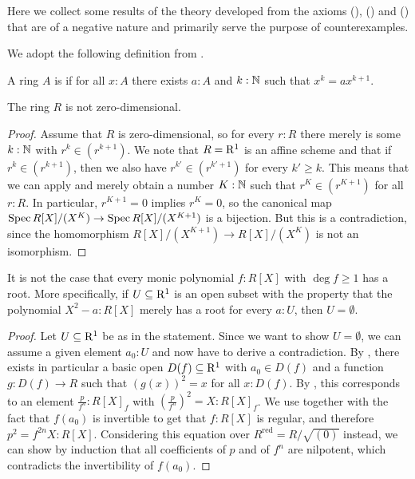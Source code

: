 Here we collect some results of
the theory developed from the axioms
(), () and ()
that are of a negative nature
and primarily serve the purpose of counterexamples.

We adopt the following definition from
\cite[Section IV.8]{lombardi-quitte}.

\begin{definition}%
  \label{zero-dimensional-ring}
  A ring $A$ is 
  if for all $x : A$
  there exists $a : A$ and $k : \mathbb{N}$
  such that $x^k = a x^{k + 1}$.
\end{definition}

\begin{lemma}%
  \label{R-not-zero-dimensional}
  The ring $R$ is not zero-dimensional.
\end{lemma}

\begin{proof}
  Assume that $R$ is zero-dimensional,
  so for every $r : R$ there merely is some $k : \mathbb{N}$ with $r^k \in (r^{k + 1})$.
  We note that $R = \mathrm{R}^1$ is an affine scheme and
  that if $r^k \in (r^{k + 1})$,
  then we also have $r^{k'} \in (r^{k' + 1})$ for every $k' \geq k$.
  This means that we can apply 
  and merely obtain a number $K : \mathbb{N}$
  such that $r^K \in (r^{K + 1})$ for all $r : R$.
  In particular, $r^{K + 1} = 0$ implies $r^K = 0$,
  so the canonical map
  $\operatorname{Spec} R[X]/(X^K) \to \operatorname{Spec} R[X]/(X^{K + 1})$
  is a bijection.
  But this is a contradiction,
  since the homomorphism $R[X]/(X^{K + 1}) \to R[X]/(X^K)$
  is not an isomorphism.
\end{proof}

\begin{example}%
  \label{non-existence-of-roots}
  It is not the case that
  every monic polynomial $f : R[X]$ with $\deg f \geq 1$ has a root.
  More specifically,
  if $U \subseteq \mathrm{R}^1$ is an open subset
  with the property that
  the polynomial $X^2 - a : R[X]$ merely has a root
  for every $a : U$,
  then $U = \emptyset$.
\end{example}

\begin{proof}
  Let $U \subseteq \mathrm{R}^1$ be as in the statement.
  Since we want to show $U = \emptyset$,
  we can assume a given element $a_0 : U$
  and now have to derive a contradiction.
  By ,
  there exists in particular a basic open $D(f) \subseteq \mathrm{R}^1$
  with $a_0 \in D(f)$
  and a function $g : D(f) \to R$
  such that ${(g(x))}^2 = x$ for all $x : D(f)$.
  By ,
  this corresponds to an element $\frac{p}{f^n} : R[X]_f$
  with ${(\frac{p}{f^n})}^2 = X : R[X]_f$.
  We use 
  together with the fact that $f(a_0)$ is invertible
  to get that $f : R[X]$ is regular,
  and therefore $p^2 = f^{2n}X : R[X]$.
  Considering this equation over $R^{\mathrm{red}} = R/\sqrt{(0)}$ instead,
  we can show by induction that all coefficients of $p$ and of $f^n$ are nilpotent,
  which contradicts the invertibility of $f(a_0)$.
\end{proof}


